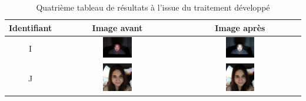\documentclass[11pt, french,screen]{report-rd-info}
\begin{document}
\begin{table}
\centering
\begin{tabular}{|c|c|c|}	
   \hline \textbf{Identifiant}  &  \textbf{Image avant}  &  \textbf{Image après} \\ \hline 
   I & \includegraphics[width=0.25\textwidth]{Resultats/pi_avant} & \includegraphics[width=0.25\textwidth]{Resultats/pi_apres} \\ \hline
   J & \includegraphics[width=0.25\textwidth]{Resultats/pj_avant} & \includegraphics[width=0.25\textwidth]{Resultats/pj_apres} \\ \hline   
\end{tabular}
\caption{Quatrième tableau de résultats à l'issue du traitement développé}
\label{tab:Resultats4}
\end{table}
\end{document}
